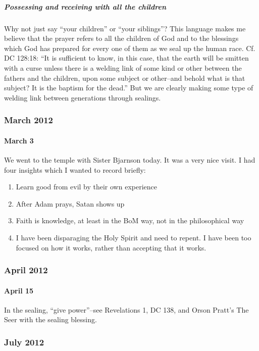 				\subparagraph*{Possessing and receiving with all the children} Why not just say ``your children'' or ``your siblings''? This language makes me believe that the prayer refers to all the children of God and to the blessings which God has prepared for every one of them as we seal up the human race. Cf. DC 128:18: ``It is sufficient to know, in this case, that the earth will be smitten with a curse unless there is a welding link of some kind or other between the fathers and the children, upon some subject or other--and behold what is that subject? It is the baptism for the dead.'' But we are clearly making some type of welding link between generations through sealings.

		\subsubsection*{March 2012}

			\paragraph*{March 3} We went to the temple with Sister Bjarnson today. It was a very nice visit. I had four insights which I wanted to record briefly:

				\begin{enumerate}
				\item Learn good from evil by their own experience
				\item After Adam prays, Satan shows up
				\item Faith is knowledge, at least in the BoM way, not in the philosophical way
				\item I have been disparaging the Holy Spirit and need to repent. I have been too focused on how it works, rather than accepting that it works.
				\end{enumerate}

		\subsubsection*{April 2012}

			\paragraph*{April 15} In the sealing, ``give power''--see Revelations 1, DC 138, and Orson Pratt's The Seer with the sealing blessing.

		\subsubsection*{July 2012}

